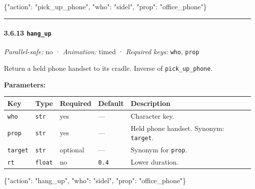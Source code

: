\documentclass[
  11pt,
]{book}
\newenvironment{Shaded}{}{}
\newcommand{\DataTypeTok}[1]{\textcolor[rgb]{0.56,0.13,0.00}{#1}}
\newcommand{\FunctionTok}[1]{\textcolor[rgb]{0.02,0.16,0.49}{#1}}
\newcommand{\StringTok}[1]{\textcolor[rgb]{0.25,0.44,0.63}{#1}}
\begin{document}
\begin{Shaded}
\begin{Highlighting}[]
\FunctionTok{\{}\DataTypeTok{"action"}\FunctionTok{:} \StringTok{"pick\_up\_phone"}\FunctionTok{,} \DataTypeTok{"who"}\FunctionTok{:} \StringTok{"sidel"}\FunctionTok{,} \DataTypeTok{"prop"}\FunctionTok{:} \StringTok{"office\_phone"}\FunctionTok{\}}
\end{Highlighting}
\end{Shaded}

\begin{center}\rule{0.5\linewidth}{0.5pt}\end{center}

\paragraph{\texorpdfstring{3.6.13
\texttt{hang\_up}}{3.6.13 hang\_up}}\label{hang_up}

\emph{Parallel-safe:} no · \emph{Animation:} timed · \emph{Required
keys:} \texttt{who}, \texttt{prop}

Return a held phone handset to its cradle. Inverse of
\texttt{pick\_up\_phone}.

\textbf{Parameters:}

\begin{longtable}[]{@{}lllll@{}}
\toprule\noalign{}
Key & Type & Required & Default & Description \\
\midrule\noalign{}
\endhead
\bottomrule\noalign{}
\endlastfoot
\texttt{who} & \texttt{str} & yes & --- & Character key. \\
\texttt{prop} & \texttt{str} & yes & --- & Held phone handset. Synonym:
\texttt{target}. \\
\texttt{target} & \texttt{str} & optional & --- & Synonym for
\texttt{prop}. \\
\texttt{rt} & \texttt{float} & no & \texttt{0.4} & Lower duration. \\
\end{longtable}

\begin{Shaded}
\begin{Highlighting}[]
\FunctionTok{\{}\DataTypeTok{"action"}\FunctionTok{:} \StringTok{"hang\_up"}\FunctionTok{,} \DataTypeTok{"who"}\FunctionTok{:} \StringTok{"sidel"}\FunctionTok{,} \DataTypeTok{"prop"}\FunctionTok{:} \StringTok{"office\_phone"}\FunctionTok{\}}
\end{Highlighting}
\end{Shaded}
\end{document}
